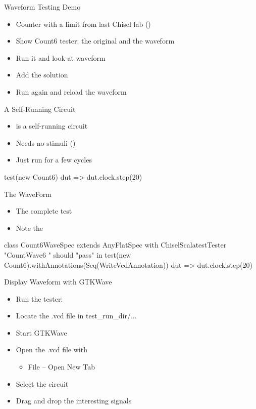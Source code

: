 \begin{frame}[fragile]{Waveform Testing Demo}
\begin{itemize}
\item Counter with a limit from last Chisel lab ()
\item Show Count6 tester: the original and the waveform
\item Run it and look at waveform
\item Add the solution
\item Run again and reload the waveform
\end{itemize}
\end{frame}

\begin{frame}[fragile]{A Self-Running Circuit}
\begin{itemize}
\item {} is a self-running circuit
\item Needs no stimuli ()
\item Just run for a few cycles
\end{itemize}
\begin{chisel}
    test(new Count6) { dut =>
      dut.clock.step(20)
    }
\end{chisel}
\end{frame}

\begin{frame}[fragile]{The WaveForm}
\begin{itemize}
\item The complete test
\item Note the 
\end{itemize}
\begin{chisel}
class Count6WaveSpec extends AnyFlatSpec with ChiselScalatestTester {
  "CountWave6 " should "pass" in {
    test(new Count6).withAnnotations(Seq(WriteVcdAnnotation)) { dut =>
      dut.clock.step(20)
    }
  }
}
\end{chisel}
\end{frame}

\begin{frame}[fragile]{Display Waveform with GTKWave}
\begin{itemize}
\item Run the tester: 
\item Locate the .vcd file in test\_run\_dir/...
\item Start GTKWave
\item Open the .vcd file with
\begin{itemize}
\item File -- Open New Tab
\end{itemize}
\item Select the circuit
\item Drag and drop the interesting signals
\end{itemize}
\end{frame}

